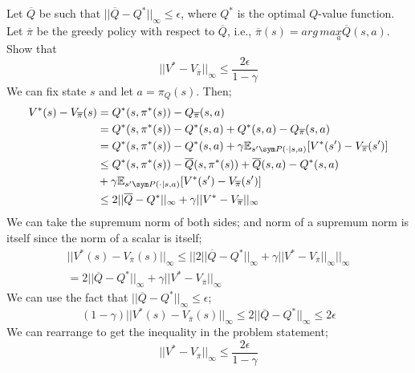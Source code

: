 \documentclass{article}
\begin{document}
\begin{tcolorbox}[colback=blue!5!white,colframe=blue!75!black,title=Question 7]
    Let $\overline Q$ be such that $||\overline Q - Q^*||_\infty \leq \epsilon$, where $Q^*$ is the optimal $Q$-value function.
    Let $\overline \pi$ be the greedy policy with respect to $\overline Q$, i.e., $\overline \pi(s) = arg\,max\limits_a \overline Q(s,a)$.
    Show that
    \begin{equation}
        ||V^* - V_{\overline \pi}||_{\infty} \leq \frac{2\epsilon}{1- \gamma}
    \end{equation}
    \tcblower
    We can fix state $s$ and let $a = \pi_Q(s)$. Then;
    \begin{equation}
        \begin{split}
            V^*(s) - V_{\overline\pi}(s) &= Q^*(s, \pi^*(s)) - Q_{\overline\pi}(s,a)\\
            &= Q^*(s, \pi^*(s)) - Q^*(s,a) + Q^*(s,a) - Q_{\overline\pi}(s,a)\\
            &= Q^*(s, \pi^*(s)) - Q^*(s,a) + \gamma \mathbb{E}_{s' \sym P(\cdot|s,a)}[V^*(s') - V_{\overline\pi}(s')]\\
            &\leq Q^*(s, \pi^*(s)) - \overline Q(s, \pi^*(s)) + \overline Q(s,a) - Q^*(s,a)\\
            &+ \gamma \mathbb{E}_{s' \sym P(\cdot|s,a)}[V^*(s') - V_{\overline\pi}(s')]\\
            &\leq 2 ||\overline Q - Q^* ||_\infty + \gamma || V^* - V_{\overline\pi} ||_\infty
        \end{split}
    \end{equation}
    We can take the supremum norm of both sides; and norm of a supremum norm is itself since the norm of a scalar is itself;
    \begin{equation}
        \begin{split}
            || V^*(s) - V_{\overline\pi}(s) ||_\infty \leq || 2 || \overline Q - Q^* ||_\infty + \gamma || V^* - V_{\overline\pi} ||_\infty ||_\infty\\
            = 2 || \overline Q - Q^* ||_\infty + \gamma || V^* - V_{\overline\pi} ||_\infty
        \end{split}
    \end{equation}
    We can use the fact that $||\overline Q - Q^*||_\infty \leq \epsilon$;
    \begin{equation}
        (1- \gamma) || V^*(s) - V_{\overline\pi}(s) ||_\infty \leq 2 || \overline Q - Q^* ||_\infty \leq 2 \epsilon 
    \end{equation}
    We can rearrange to get the inequality in the problem statement;
    \begin{equation}
        ||V^* - V_{\overline \pi}||_{\infty} \leq \frac{2\epsilon}{1- \gamma}
    \end{equation}
\end{tcolorbox}


\end{document}
